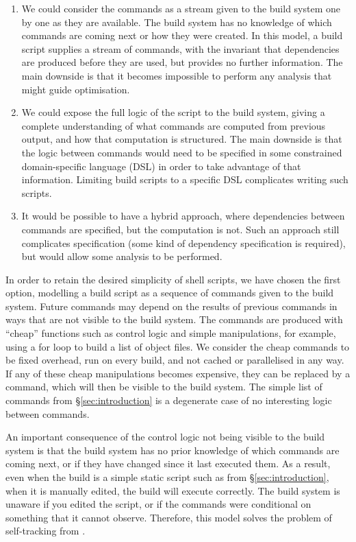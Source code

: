\begin{enumerate}
\item We could consider the commands as a stream given to the build system one by one as they are available. The build system has no knowledge of which commands are coming next or how they were created. In this model, a build script supplies a stream of commands, with the invariant that dependencies are produced before they are used, but provides no further information. The main downside is that it becomes impossible to perform any analysis that might guide optimisation.
\item We could expose the full logic of the script to the build system, giving a complete understanding of what commands are computed from previous output, and how that computation is structured. The main downside is that the logic between commands would need to be specified in some constrained domain-specific language (DSL) in order to take advantage of that information. Limiting build scripts to a specific DSL complicates writing such scripts.
\item It would be possible to have a hybrid approach, where dependencies between commands are specified, but the computation is not. Such an approach still complicates specification (some kind of dependency specification is required), but would allow some analysis to be performed.
\end{enumerate}

In order to retain the desired simplicity of shell scripts, we have chosen the first option, modelling a build script as a sequence of commands given to the build system. Future commands may depend on the results of previous commands in ways that are not visible to the build system. The commands are produced with ``cheap'' functions such as control logic and simple manipulations, for example, using a for loop to build a list of object files. We consider the cheap commands to be fixed overhead, run on every build, and not cached or parallelised in any way. If any of these cheap manipulations becomes expensive, they can be replaced by a command, which will then be visible to the build system. The simple list of commands from \S\ref{sec:introduction} is a degenerate case of no interesting logic between commands.

An important consequence of the control logic not being visible to the build system is that the build system has no prior knowledge of which commands are coming next, or if they have changed since it last executed them. As a result, even when the build is a simple static script such as from \S\ref{sec:introduction}, when it is manually edited, the build will execute correctly. The build system is unaware if you edited the script, or if the commands were conditional on something that it cannot observe. Therefore, this model solves the problem of self-tracking from \citet[\S6.5]{build_systems_a_la_carte}.

